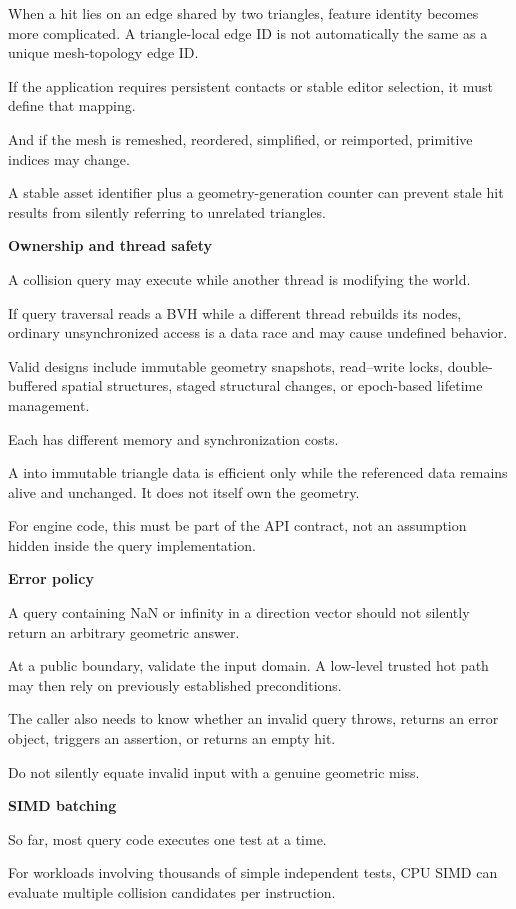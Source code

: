 When a hit lies on an edge shared by two triangles, feature identity becomes more complicated. A triangle-local edge ID is not automatically the same as a unique mesh-topology edge ID.

If the application requires persistent contacts or stable editor selection, it must define that mapping.

And if the mesh is remeshed, reordered, simplified, or reimported, primitive indices may change.

A stable asset identifier plus a geometry-generation counter can prevent stale hit results from silently referring to unrelated triangles.

\textbf{Ownership and thread safety}

A collision query may execute while another thread is modifying the world.

If query traversal reads a BVH while a different thread rebuilds its nodes, ordinary unsynchronized access is a data race and may cause undefined behavior.

Valid designs include immutable geometry snapshots, read--write locks, double-buffered spatial structures, staged structural changes, or epoch-based lifetime management.

Each has different memory and synchronization costs.

A  into immutable triangle data is efficient only while the referenced data remains alive and unchanged. It does not itself own the geometry.

For engine code, this must be part of the API contract, not an assumption hidden inside the query implementation.

\textbf{Error policy}

A query containing NaN or infinity in a direction vector should not silently return an arbitrary geometric answer.

At a public boundary, validate the input domain. A low-level trusted hot path may then rely on previously established preconditions.

The caller also needs to know whether an invalid query throws, returns an error object, triggers an assertion, or returns an empty hit.

Do not silently equate invalid input with a genuine geometric miss.

\textbf{SIMD batching}

So far, most query code executes one test at a time.

For workloads involving thousands of simple independent tests, CPU SIMD can evaluate multiple collision candidates per instruction.

